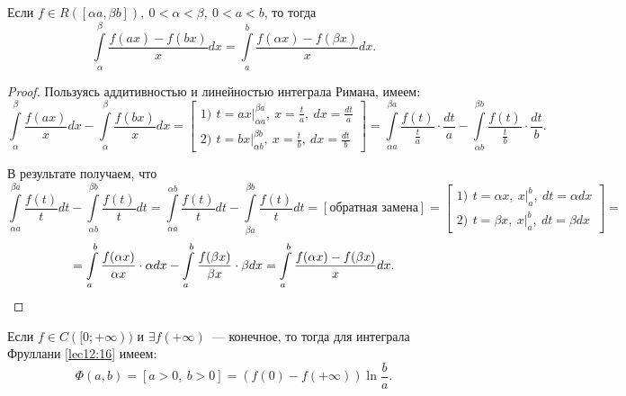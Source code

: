 \documentclass[../../main.tex]{subfiles}
\begin{document}
\begin{lem}[Фруллани]
Если $f \in R([\alpha a, \beta b]),\ 0 < \alpha < \beta,\ 0 < a < b$, то тогда 
\begin{equation}
\int\limits_\alpha^\beta \frac{f(ax) - f(bx)}x dx = \int\limits_a^b 
\frac{f(\alpha x) - f(\beta x)}x dx.
\label{lec12:17} 
\end{equation}
\end{lem}

\begin{proof}
Пользуясь аддитивностью и линейностью интеграла Римана, имеем: 
\[\int\limits_\alpha^\beta \frac{f(ax)}x dx - \int\limits_\alpha^\beta 
\frac{f(bx)}x dx = \left[
\begin{gathered}
1)\ \, t = ax\big|_{\alpha a}^{\beta a},\ x = \frac ta,\ dx = \frac{dt}a \\
2)\ \, t = bx\big|_{\alpha b}^{\beta b},\ x = \frac tb,\ dx = \frac{dt}b
\end{gathered}
\right] = \int\limits_{\alpha a}^{\beta a} \frac{f(t)}{\frac ta} \cdot \frac 
{dt}a - \int\limits_{\alpha b}^{\beta b} \frac{f(t)}{\frac tb} \cdot \frac 
{dt}b.\] 

В результате получаем, что
\[\int\limits_{\alpha a}^{\beta a} \dfrac{f(t)}t dt - \int\limits_{\alpha 
b}^{\beta b} \frac{f(t)}t dt = \int\limits_{\alpha a}^{\alpha b} \frac{f(t)}t 
dt - \int\limits_{\beta a}^{\beta b} \frac{f(t)}t dt = [\text{обратная 
замена}] = \left[
\begin{gathered}
1)\ \, t = \alpha x,\ x\big|_a^b,\ dt = \alpha dx \\
2)\ \, t = \beta x,\ x\big|_a^b,\ dt = \beta dx
\end{gathered}
\right] =\]
\[= \int\limits_a^b \frac{f(\alpha x)}{\alpha x} \cdot \alpha dx - 
\int\limits_a^b \frac{f(\beta x)}{\beta x} \cdot\beta dx = \int\limits_a^b 
\frac{f(\alpha x) - f(\beta x)}x dx. \qedhere\]
\end{proof}

\begin{thm}
Если $f \in C([0; +\infty))$ и $\exists f(+\infty)$~--- конечное, то тогда для 
интеграла Фруллани \eqref{lec12:16} имеем:
\begin{equation}
\Phi(a, b) = [a > 0,\ b > 0] = (f(0) - f(+\infty))\ln \frac ba. 
\label{lec12:18} 
\end{equation}
\end{thm}
\end{document}
